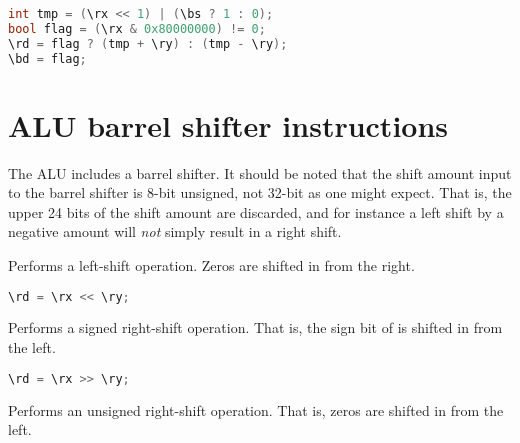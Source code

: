 \begin{lstlisting}[numbers=none, basicstyle=\ttfamily\footnotesize, language=C++]
int tmp = (\rx << 1) | (\bs ? 1 : 0);
bool flag = (\rx & 0x80000000) != 0;
\rd = flag ? (tmp + \ry) : (tmp - \ry);
\bd = flag;
\end{lstlisting}

\section{ALU barrel shifter instructions}


The \rvex{} ALU includes a barrel shifter. It should be noted that the shift
amount input to the barrel shifter is 8-bit unsigned, not 32-bit as one might
expect. That is, the upper 24 bits of the shift amount are discarded, and for
instance a left shift by a negative amount will \emph{not} simply result in a
right shift.

Performs a left-shift operation. Zeros are shifted in from the right.

\begin{lstlisting}[numbers=none, basicstyle=\ttfamily\footnotesize, language=C++]
\rd = \rx << \ry;
\end{lstlisting}

Performs a signed right-shift operation. That is, the sign bit of \code{\rx} is
shifted in from the left.

\begin{lstlisting}[numbers=none, basicstyle=\ttfamily\footnotesize, language=C++]
\rd = \rx >> \ry;
\end{lstlisting}

Performs an unsigned right-shift operation. That is, zeros are shifted in from
the left.

